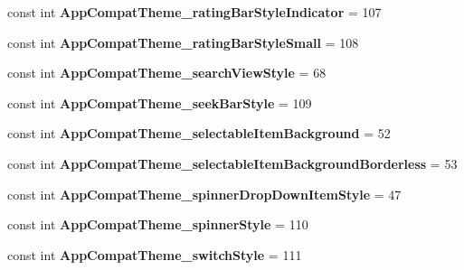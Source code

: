 \begin{DoxyCompactItemize}
\item 
\mbox{\label{classXaria_1_1Resource_1_1Styleable_a4aa9443522a17c98fef0d23bc9d7cd3d}} 
const int {\bfseries App\+Compat\+Theme\+\_\+rating\+Bar\+Style\+Indicator} = 107
\item 
\mbox{\label{classXaria_1_1Resource_1_1Styleable_ab6c9a78981742ada16351e70316b4020}} 
const int {\bfseries App\+Compat\+Theme\+\_\+rating\+Bar\+Style\+Small} = 108
\item 
\mbox{\label{classXaria_1_1Resource_1_1Styleable_a8ef5ec0e6400bf7127391622b7b8763d}} 
const int {\bfseries App\+Compat\+Theme\+\_\+search\+View\+Style} = 68
\item 
\mbox{\label{classXaria_1_1Resource_1_1Styleable_acfeb9f30d498983503fb9df31a0d776f}} 
const int {\bfseries App\+Compat\+Theme\+\_\+seek\+Bar\+Style} = 109
\item 
\mbox{\label{classXaria_1_1Resource_1_1Styleable_a46fd4b83bf1011668f61a6b23f6cbb32}} 
const int {\bfseries App\+Compat\+Theme\+\_\+selectable\+Item\+Background} = 52
\item 
\mbox{\label{classXaria_1_1Resource_1_1Styleable_ad966225e8b46e35f49e362f585ae353a}} 
const int {\bfseries App\+Compat\+Theme\+\_\+selectable\+Item\+Background\+Borderless} = 53
\item 
\mbox{\label{classXaria_1_1Resource_1_1Styleable_a66eacf53e04fe78acfde373c31d29e72}} 
const int {\bfseries App\+Compat\+Theme\+\_\+spinner\+Drop\+Down\+Item\+Style} = 47
\item 
\mbox{\label{classXaria_1_1Resource_1_1Styleable_a389a4ab84529ceae2391e8a7c2b3c00d}} 
const int {\bfseries App\+Compat\+Theme\+\_\+spinner\+Style} = 110
\item 
\mbox{\label{classXaria_1_1Resource_1_1Styleable_a39a9fb315c7f7a0a6749450eb89e42d1}} 
const int {\bfseries App\+Compat\+Theme\+\_\+switch\+Style} = 111

\end{DoxyCompactItemize}
